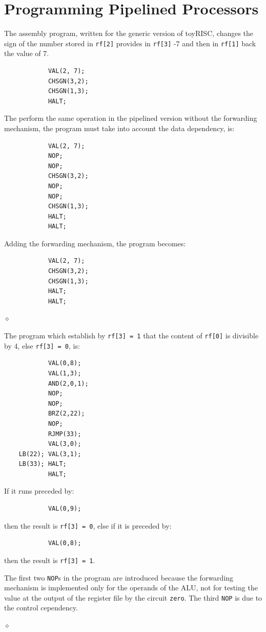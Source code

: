 \section{Programming Pipelined Processors}

\begin{exemplu}
The assembly program, written for the generic version of toyRISC, changes the sign of the number stored in {\tt rf[2]} provides in {\tt rf[3]} -7 and then in {\tt rf[1]} back the value of 7.

\begin{verbatim}
            VAL(2, 7);
            CHSGN(3,2);
            CHSGN(1,3);
            HALT;
\end{verbatim}

The perform the same operation in the pipelined version without the forwarding mechanism, the program must take into account the data dependency, is:
\begin{verbatim}
            VAL(2, 7);
            NOP;
            NOP;
            CHSGN(3,2);
            NOP;
            NOP;
            CHSGN(1,3);
            HALT;
            HALT;
\end{verbatim}

Adding the forwarding mechanism, the program becomes:
\begin{verbatim}
            VAL(2, 7);
            CHSGN(3,2);
            CHSGN(1,3);
            HALT;
            HALT;
\end{verbatim}

$\diamond$
\end{exemplu}

\begin{exemplu}
The program which establish by {\tt rf[3] = 1} that the content of {\tt rf[0]} is divisible by 4, else {\tt rf[3] = 0}, is:

\begin{verbatim}
            VAL(0,8);
            VAL(1,3);
            AND(2,0,1);
            NOP;
            NOP;
            BRZ(2,22);
            NOP;
            RJMP(33);
            VAL(3,0);
    LB(22); VAL(3,1);
    LB(33); HALT;
            HALT;
\end{verbatim}
If it runs  preceded by:
\begin{verbatim}
            VAL(0,9);
\end{verbatim}
then the result is {\tt rf[3] = 0}, else if it is preceded by:
\begin{verbatim}
            VAL(0,8);
\end{verbatim}
then the result is {\tt rf[3] = 1}.

The first two {\tt NOP}s in the program are introduced because the forwarding mechanism is implemented only for the operands of the ALU, not for testing the value at the output of the register file by the circuit {\tt zero}. The third {\tt NOP} is due to the control cependency.

$\diamond$
\end{exemplu}

